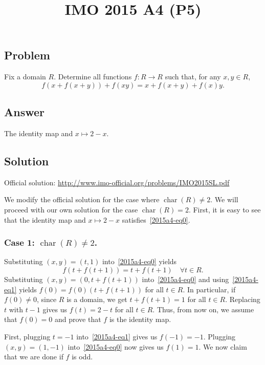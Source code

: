 \documentclass{article}
\title{IMO 2015 A4 (P5)}
\author{}
\date{}
\DeclareMathOperator{\rchar}{char}
\begin{document}
\maketitle



\subsection*{Problem}

Fix a domain $R$.
Determine all functions $f : R \to R$ such that, for any $x, y \in R$,
\[ f(x + f(x + y)) + f(xy) = x + f(x + y) + f(x) y. \tag{*}\label{2015a4-eq0} \]



\subsection*{Answer}

The identity map and $x \mapsto 2 - x$.



\subsection*{Solution}

Official solution: \url{http://www.imo-official.org/problems/IMO2015SL.pdf}

We modify the official solution for the case where $\rchar(R) \neq 2$.
We will proceed with our own solution for the case $\rchar(R) = 2$.
First, it is easy to see that the identity map and $x \mapsto 2 - x$ satisfies~\eqref{2015a4-eq0}.


\subsubsection*{Case 1: $\rchar(R) \neq 2$.}

Substituting $(x, y) = (t, 1)$ into~\eqref{2015a4-eq0} yields
\[ f(t + f(t + 1)) = t + f(t + 1) \quad \forall t \in R. \tag{1}\label{2015a4-eq1} \]
Substituting $(x, y) = (0, t + f(t + 1))$ into~\eqref{2015a4-eq0} and using~\eqref{2015a4-eq1} yields $f(0) = f(0) (t + f(t + 1))$ for all $t \in R$.
In particular, if $f(0) \neq 0$, since $R$ is a domain, we get $t + f(t + 1) = 1$ for all $t \in R$.
Replacing $t$ with $t - 1$ gives us $f(t) = 2 - t$ for all $t \in R$.
Thus, from now on, we assume that $f(0) = 0$ and prove that $f$ is the identity map.

First, plugging $t = -1$ into~\eqref{2015a4-eq1} gives us $f(-1) = -1$.
Plugging $(x, y) = (1, -1)$ into~\eqref{2015a4-eq0} now gives us $f(1) = 1$.
We now claim that we are done if $f$ is odd.
\end{document}
